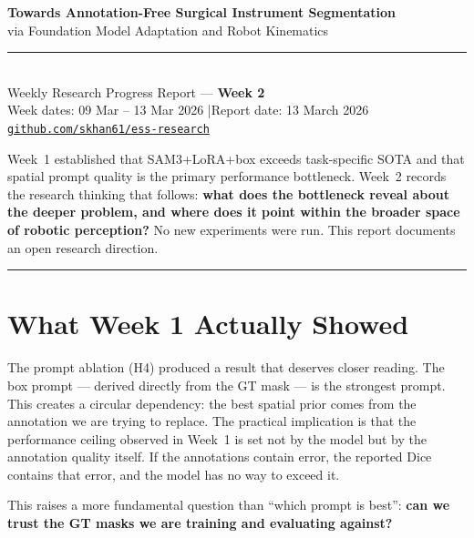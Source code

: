 \documentclass[11pt, a4paper]{article}
\begin{document}
\begin{center}
    {\LARGE \textbf{Towards Annotation-Free Surgical Instrument Segmentation}}\\[0.3em]
    {\large via Foundation Model Adaptation and Robot Kinematics}\\[0.5em]
    \rule{0.5\linewidth}{0.4pt}\\[0.4em]
    {\normalsize Weekly Research Progress Report --- \textbf{Week 2}}\\[0.3em]
    {\normalsize Week dates: 09 Mar -- 13 Mar 2026 \quad|\quad Report date: 13 March 2026}\\[0.3em]
    {\normalsize \href{https://github.com/skhan61/ess-research}{\texttt{github.com/skhan61/ess-research}}}
\end{center}
\vspace{0.5em}

\noindent Week~1 established that SAM3+LoRA+box exceeds task-specific SOTA and that
spatial prompt quality is the primary performance bottleneck.
Week~2 records the research thinking that follows: \textbf{what does the
bottleneck reveal about the deeper problem, and where does it point within the
broader space of robotic perception?}
No new experiments were run. This report documents an open research direction.

\hrule
\vspace{1em}

\section{What Week 1 Actually Showed}

The prompt ablation (H4) produced a result that deserves closer reading.
The box prompt --- derived directly from the GT mask --- is the strongest
prompt. This creates a circular dependency: the best spatial prior comes
from the annotation we are trying to replace.
The practical implication is that the performance ceiling observed in Week~1
is set not by the model but by the annotation quality itself.
If the annotations contain error, the reported Dice contains that error,
and the model has no way to exceed it.

This raises a more fundamental question than ``which prompt is best'':
\textbf{can we trust the GT masks we are training and evaluating against?}
\end{document}
